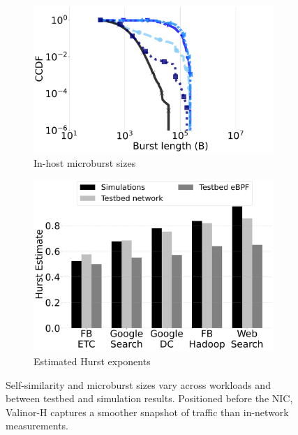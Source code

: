 \begin{figure}[t]
\begin{subfigure}[t]{0.40\linewidth}
	\label{fig:wcdf-testbed}
\end{subfigure}
\begin{subfigure}[t]{0.40\linewidth}
    \centering
    	\includegraphics[width=1\linewidth]{figs/wccdf_ebpf_testbed.pdf}
    \caption{In-host microburst sizes}
	\label{fig:fwccdf-ebpf}
\end{subfigure}
\begin{subfigure}[t]{0.36\linewidth}
    \centering
    \includegraphics[width=1\linewidth]{figs/w_ebpf_hurst_bar.pdf}
    \caption{Estimated Hurst exponents}
	\label{fig:whurst-ebpf}
\end{subfigure}

    \caption{\small{
    Self-similarity and microburst sizes vary across workloads and between testbed and simulation results. Positioned before the NIC, Valinor-H captures a smoother snapshot of traffic than in-network measurements.
    }}
	\label{fig:traces}
 \vspace{-5mm}
\end{figure}

